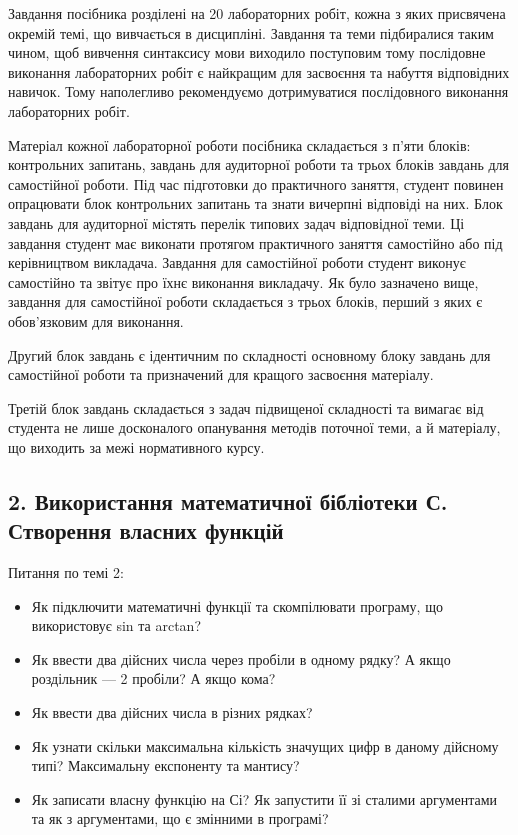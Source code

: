 \documentclass[]{article}
\begin{document}
Завдання посібника розділені на 20 лабораторних робіт, кожна з яких
присвячена окремій темі, що вивчається в дисципліні. Завдання та теми
підбиралися таким чином, щоб вивчення синтаксису мови виходило
поступовим тому послідовне виконання лабораторних робіт є найкращим для
засвоєння та набуття відповідних навичок. Тому наполегливо рекомендуємо
дотримуватися послідовного виконання лабораторних робіт.

Матеріал кожної лабораторної роботи посібника складається з п'яти
блоків: контрольних запитань, завдань для аудиторної роботи та трьох
блоків завдань для самостійної роботи. Під час підготовки до практичного
заняття, студент повинен опрацювати блок контрольних запитань та знати
вичерпні відповіді на них. Блок завдань для аудиторної містять перелік
типових задач відповідної теми. Ці завдання студент має виконати
протягом практичного заняття самостійно або під керівництвом викладача.
Завдання для самостійної роботи студент виконує самостійно та звітує про
їхнє виконання викладачу. Як було зазначено вище, завдання для
самостійної роботи складається з трьох блоків, перший з яких є
обов'язковим для виконання.

Другий блок завдань є ідентичним по складності основному блоку завдань
для самостійної роботи та призначений для кращого засвоєння матеріалу.

Третій блок завдань складається з задач підвищеної складності та вимагає
від студента не лише досконалого опанування методів поточної теми, а й
матеріалу, що виходить за межі нормативного курсу.


\newpage
\subsection{ 2. Використання математичної бібліотеки С. Створення власних функцій }
\setcounter{subsection}{1}

Питання по темі 2:

\begin{itemize}
\item
  Як підключити математичні функції та скомпілювати програму, що
  використовує sin та arctan?
\item
  Як ввести два дійсних числа через пробіли в одному рядку? А якщо
  роздільник --- 2 пробіли? А якщо кома?
\item
  Як ввести два дійсних числа в різних рядках?
\item
  Як узнати скільки максимальна кількість значущих цифр в даному
  дійсному типі? Максимальну експоненту та мантису?
\item
  Як записати власну функцію на Сі? Як запустити її зі сталими
  аргументами та як з аргументами, що є змінними в програмі?
\end{itemize}
\end{document}
